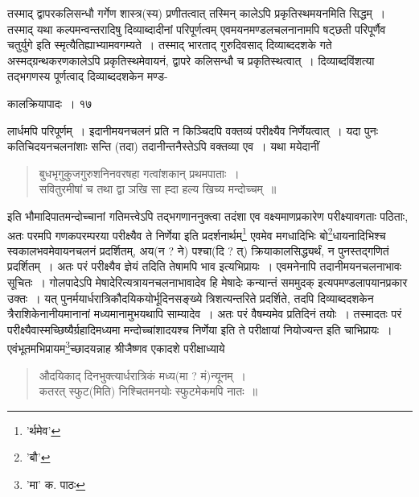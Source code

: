 \documentclass[11pt, openany]{book}
\begin{document}
{\noindent तस्माद् द्वापरकलिसन्धौ गर्गेण शास्त्र(स्य) प्रणीतत्वात् तस्मिन् कालेऽपि प्रकृतिस्थमयनमिति सिद्धम्~। तस्माद् यथा कल्पमन्वन्तरादिषु दिव्याब्दादीनां परिपूर्णत्वम् एवमयनमण्डलचलनानामपि षट्छती परिपूर्णैव चतुर्युगे इति स्मृत्यैतिह्याभ्यामवगम्यते~। तस्माद् भारताद् गुरुदिवसाद् दिव्याब्ददशके गते अस्मद्ग्रन्थकरणकालेऽपि प्रकृतिस्थमेवायनं, द्वापरे कलिसन्धौ च प्रकृतिस्थत्वात्~। दिव्याब्दविंशत्या तद्भगणस्य पूर्णत्वाद् दिव्याब्ददशकेन मण्ड-

\newpage

\vspace{3cm} \hspace{4cm}कालक्रियापादः~।\hspace{4cm} १७

\vspace{0.3cm}
\noindent लार्धमपि परिपूर्णम्~। इदानीमयनचलनं प्रति न किञ्चिदपि वक्तव्यं परीक्ष्यैव निर्णेयत्वात्~। यदा पुनः कतिचिदयनचलनांशाः सन्ति (तदा) तदानीन्तनैस्तेऽपि वक्तव्या एव~। यथा मयेदानीं

\begin{quote}
{\qt बुधभृगुकुजगुरुशनिनवरषहा गत्वांशकान् प्रथमपाताः~।\\
सवितुरमीषां च तथा द्वा ञखि सा ह्दा हल्य खिच्य मन्दोच्चम्~॥}
\end{quote}

\noindent इति भौमादिपातमन्दोच्चानां गतिमत्त्वेऽपि तद्भगणाननुक्त्वा तदंशा एव वक्ष्यमाणप्रकारेण परीक्ष्यावगताः पठिताः, अतः परमपि गणकपरम्परया परीक्ष्यैव ते निर्णेया इति प्रदर्शनार्थम्\renewcommand{\thefootnote}{१}\footnote{'र्थमेव'} एवमेव मगधादिभिः बो\renewcommand{\thefootnote}{२}\footnote{'बौ'}धायनादिभिश्च स्वकालभवमेवायनचलनं प्रदर्शितम्, अय(न ? ने) पश्चा(दि ? त्) क्रियाकालसिद्ध्यर्थं, न पुनस्तद्गणितं प्रदर्शितम्~। अतः परं परीक्ष्यैव ज्ञेयं तदिति तेषामपि भाव इत्यभिप्रायः~। एवमनेनापि तदानीमयनचलनाभावः सूचितः~। गोलपादेऽपि मेषादेरित्यत्रायनचलनाभावादेव हि {\qt मेषादेः कन्यान्तं सममुदक्} इत्यपमण्डलापयानप्रकार उक्तः~। यत् पुनर्मयार्धरात्रिकौदयिकयोर्भूदिनसङ्ख्ये त्रिशत्यन्तरिते प्रदर्शिते, तदपि दिव्याब्ददशकेन त्रैराशिकेनानीयमानानां मध्यमानामुभयथापि साम्यादेव~। अतः परं वैषम्यमेव प्रतिदिनं तयोः~। तस्मादतः परं परीक्ष्यैवास्मच्छिष्यैर्ग्रहादिमध्यमा
मन्दोच्चांशादयश्च निर्णेया इति ते परीक्षायां नियोज्यन्त इति चाभिप्रायः~। एवंभूतमभिप्रायम\renewcommand{\thefootnote}{३}\footnote{'मा' क. पाठः}च्छादयन्नाह श्रीजैष्णव एकादशे परीक्षाध्याये\textendash

\begin{quote}
{\qt औदयिकाद् दिनभुक्त्यार्धरात्रिकं मध्य(मा ? मं)न्यूनम्~।\\
कतरत् स्फुट(मिति) निश्चितमनयोः स्फुटमेकमपि नातः~॥}
\end{quote}

}
\end{document}
